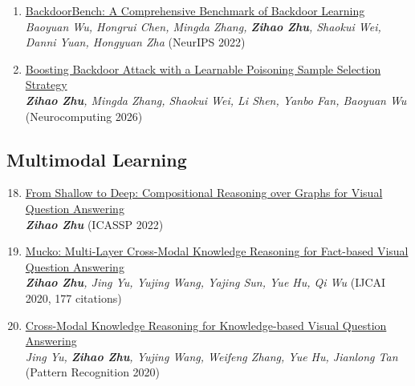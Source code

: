 \documentclass[11pt,a4paper,sans]{moderncv}
\newcommand{\darkred}[1]{\textcolor{harvardcrimson}{#1}}
\newcommand{\paperlink}[2]{\hypersetup{urlcolor=black}\href{#1}{#2}\hypersetup{urlcolor=blue}}
\begin{document}
\begin{enumerate}[itemsep=2pt, topsep=2pt, parsep=0pt]
    \item \paperlink{https://arxiv.org/pdf/2211.00346}{BackdoorBench: A Comprehensive Benchmark of Backdoor Learning}\\
    \textit{Baoyuan Wu, Hongrui Chen, Mingda Zhang, \textbf{Zihao Zhu}, Shaokui Wei, Danni Yuan, Hongyuan Zha} \darkred{(NeurIPS 2022)}
    
    \item \paperlink{https://arxiv.org/pdf/2307.07328}{Boosting Backdoor Attack with a Learnable Poisoning Sample Selection Strategy}\\
    \textit{\textbf{Zihao Zhu}, Mingda Zhang, Shaokui Wei, Li Shen, Yanbo Fan, Baoyuan Wu} \darkred{(Neurocomputing 2026)}
    \end{enumerate}

\subsection{Multimodal Learning}
    \begin{enumerate}[itemsep=2pt, topsep=2pt, parsep=0pt]
    \setcounter{enumi}{17}
    \item \paperlink{https://arxiv.org/pdf/2206.12533}{From Shallow to Deep: Compositional Reasoning over Graphs for Visual Question Answering}\\
    \textit{\textbf{Zihao Zhu}} \darkred{(ICASSP 2022)}
    
    \item \paperlink{https://arxiv.org/pdf/2006.09073}{Mucko: Multi-Layer Cross-Modal Knowledge Reasoning for Fact-based Visual Question Answering}\\
    \textit{\textbf{Zihao Zhu}, Jing Yu, Yujing Wang, Yajing Sun, Yue Hu, Qi Wu} \darkred{(IJCAI 2020, 177 citations)}
    
    \item \paperlink{https://arxiv.org/pdf/2009.00145}{Cross-Modal Knowledge Reasoning for Knowledge-based Visual Question Answering}\\
    \textit{Jing Yu, \textbf{Zihao Zhu}, Yujing Wang, Weifeng Zhang, Yue Hu, Jianlong Tan} \darkred{(Pattern Recognition 2020)}
    \end{enumerate}
\end{document}
